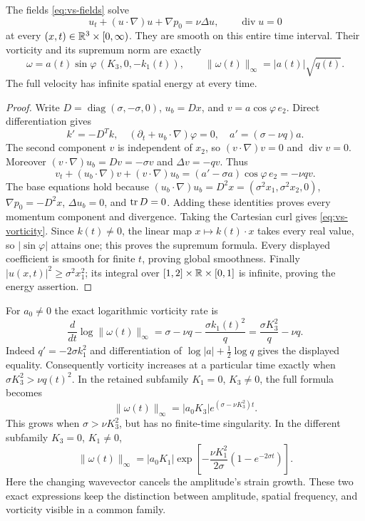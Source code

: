 \begin{proposition}
The fields \eqref{eq:vs-fields} solve
\[
 u_t+(u\cdot\nabla)u+\nabla p_0=\nu\Delta u,
 \qquad \operatorname{div}u=0
\]
at every $(x,t)\in\mathbb R^3\times[0,\infty)$. They are smooth on this
entire time interval. Their vorticity and its supremum norm are exactly
\begin{equation}\label{eq:vs-vorticity}
 \omega=a(t)\sin\varphi\,(K_3,0,-k_1(t)),
 \qquad \|\omega(t)\|_\infty=|a(t)|\sqrt{q(t)}.
\end{equation}
The full velocity has infinite spatial energy at every time.
\end{proposition}
\begin{proof}
Write $D=\operatorname{diag}(\sigma,-\sigma,0)$,
$u_b=Dx$, and $v=a\cos\varphi\,e_2$. Direct differentiation gives
\[
 k'=-D^Tk,\quad (\partial_t+u_b\cdot\nabla)\varphi=0,
 \quad a'=(\sigma-\nu q)a.
\]
The second component $v$ is independent of $x_2$, so
$(v\cdot\nabla)v=0$ and $\operatorname{div}v=0$.
Moreover $(v\cdot\nabla)u_b=Dv=-\sigma v$ and
$\Delta v=-qv$. Thus
\[
 v_t+(u_b\cdot\nabla)v+(v\cdot\nabla)u_b
 =(a'-\sigma a)\cos\varphi\,e_2=-\nu qv.
\]
The base equations hold because
$(u_b\cdot\nabla)u_b=D^2x=(\sigma^2x_1,\sigma^2x_2,0)$,
$\nabla p_0=-D^2x$, $\Delta u_b=0$, and $\operatorname{tr} D=0$.
Adding these identities proves every momentum component and divergence.
Taking the Cartesian curl gives \eqref{eq:vs-vorticity}. Since
$k(t)\ne0$, the linear map $x\mapsto k(t)\cdot x$ takes every real
value, so $|\sin\varphi|$ attains one; this proves the supremum formula.
Every displayed coefficient is smooth for finite $t$, proving global
smoothness. Finally $|u(x,t)|^2\geq\sigma^2x_1^2$; its integral over
$[1,2]\times\mathbb R\times[0,1]$ is infinite, proving the energy assertion.
\end{proof}

For $a_0\ne0$ the exact logarithmic vorticity rate is
\begin{equation}\label{eq:vs-growth}
 \frac{d}{dt}\log\|\omega(t)\|_\infty
 =\sigma-\nu q-\frac{\sigma k_1(t)^2}{q}
 =\frac{\sigma K_3^2}{q}-\nu q.
\end{equation}
Indeed $q'=-2\sigma k_1^2$ and differentiation of
$\log|a|+\tfrac12\log q$ gives the displayed equality. Consequently
vorticity increases at a particular time exactly when
$\sigma K_3^2>\nu q(t)^2$. In the retained subfamily $K_1=0$,
$K_3\ne0$, the full formula becomes
\[
 \|\omega(t)\|_\infty
 =|a_0K_3|e^{(\sigma-\nu K_3^2)t}.
\]
This grows when $\sigma>\nu K_3^2$, but has no finite-time
singularity. In the different subfamily $K_3=0$, $K_1\ne0$,
\[
 \|\omega(t)\|_\infty
 =|a_0K_1|\exp\left[-\frac{\nu K_1^2}{2\sigma}
 (1-e^{-2\sigma t})\right].
\]
Here the changing wavevector cancels the amplitude's strain growth. These
two exact expressions keep the distinction between amplitude, spatial
frequency, and vorticity visible in a common family.

